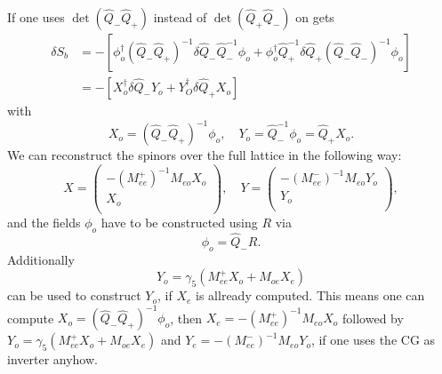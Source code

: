 If one uses $\det(\hat Q_{-}\hat Q_{+})$ instead of $\det(\hat
Q_{+}\hat Q_{-})$ on gets
\begin{equation}
  \label{eq:eo11}
  \begin{split}
    \delta S_b & = -[\phi_o^\dagger(\hat Q_{-} \hat Q_{+})^{-1}\delta\hat Q_{-}\hat
    Q_{-}^{-1} \phi_o + \phi_o^\dagger \hat Q_{+}^{-1}\delta\hat Q_{+}(\hat
    Q_{-}\hat Q_{-})^{-1}\phi_o]\\
    & = -[X_o^\dagger\delta\hat Q_{-}Y_o + Y_O^\dagger\delta\hat Q_{+}X_o]
  \end{split}
\end{equation}
with
\begin{equation}
  \label{eq:eo12}
  X_o = (\hat Q_{-} \hat Q_{+})^{-1}\phi_o, \quad Y_o = \hat Q_{-}^{-1}\phi_o=\hat
  Q_{+} X_o.
\end{equation}
 We can reconstruct the spinors over the full lattice in the following
way:
\begin{equation}
  \label{eq:eo13}
  X = 
  \begin{pmatrix}
    -(M_{ee}^+)^{-1}M_{eo}X_o \\ X_o\\
  \end{pmatrix},\quad
  Y = 
  \begin{pmatrix}
    -(M_{ee}^-)^{-1}M_{eo}Y_o \\ Y_o\\
  \end{pmatrix},
\end{equation}
and the fields $\phi_o$ have to be constructed using $R$ via
\begin{equation}
  \label{eq:14}
  \phi_o = \hat Q_{-} R.
\end{equation}
Additionally 
\[
Y_o = \gamma_5(M_{ee}^{+}X_o + M_{oe} X_e)
\]
can be used to construct $Y_o$, if $X_e$ is allready computed. This
means one can compute $X_o = (\hat Q_{-} \hat Q_{+})^{-1}\phi_o$, then
$X_e = -(M_{ee}^+)^{-1}M_{eo}X_o$ followed by $Y_o = \gamma_5(M_{ee}^{+}X_o
+ M_{oe} X_e)$ and $Y_e = -(M_{ee}^-)^{-1}M_{eo}Y_o$, if one uses the
CG as inverter anyhow.

